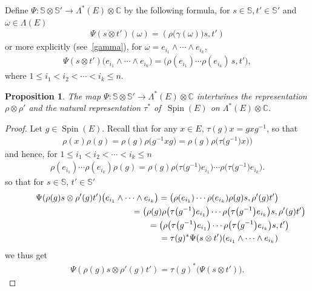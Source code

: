 \documentclass[pdftex]{sigma}
\DeclareMathOperator{\Spin}{Spin}
\numberwithin{equation}{section}
\newtheorem{prop}[theor]{Proposition}
\begin{document}
Define $\Psi \colon \mathbb S\otimes \mathbb S'\to\Lambda^*(E)\otimes \mathbb C$ by the following formula, for $s\in \mathbb S, t'\in \mathbb S'$ and $\omega\in \Lambda(E)$
\begin{gather*}
\Psi(s\otimes t') (\omega) = (\rho\big(\gamma(\omega)\big)s,t')
\end{gather*}
or more explicitly (see~\eqref{gamma}), for $\omega = e_{i_1}\wedge \cdots \wedge e_{i_k}$,
\begin{gather*}
\Psi(s\otimes t') \big(e_{i_1}\wedge \cdots \wedge e_{i_k} \big) = \big( \rho(e_{i_1}) \cdots \rho(e_{i_k})\, s,t'\big),
\end{gather*}
where $1\leq i_1<i_2<\cdots<i_k\leq n$.
\begin{prop} The map $\Psi \colon \mathbb S \otimes \mathbb S' \to \Lambda^*(E) \otimes \mathbb C$ intertwines the representation $\rho\otimes \rho'$ and the natural representation $\tau^*$ of \,$\Spin(E)$ on $\Lambda^*(E)\otimes \mathbb C$.
\end{prop}
%
\begin{proof}
Let $g\in \Spin(E)$. Recall that for any $x\in E$, $\tau(g) x = gxg^{-1}$, so that
\begin{gather*}
\rho(x) \rho(g) = \rho(g) \rho\big(g^{-1}xg\big) = \rho(g) \rho\big(\tau\big(g^{-1}\big) x)\big)
\end{gather*}
and hence, for $1\leq i_1<i_2<\cdots <i_k\leq n$
\begin{gather*}
\rho(e_{i_1}) \cdots \rho(e_{i_k}) \rho(g) = \rho(g) \rho\big( \tau\big(g^{-1}\big) e_{i_1}\big)\cdots \rho\big( \tau\big(g^{-1}\big) e_{i_k}\big).
\end{gather*}
so that for $s\in \mathbb S$, $t'\in \mathbb S'$
\begin{gather*}
\Psi(\rho(g)s\otimes\rho'(g)t')\big( e_{i_1}\wedge \cdots \wedge e_{i_k}\big) = \big(\rho(e_{i_1}) \cdots \rho(e_{i_k}) \rho(g) s,\rho'(g)t'\big)
\\ \hphantom{\Psi(\rho(g)s\otimes\rho'(g)t')\big( e_{i_1}\wedge \cdots \wedge e_{i_k}\big)}
 {}= \big( \rho(g) \rho\big( \tau\big(g^{-1}\big) e_{i_1}\big)\cdots \rho\big( \tau\big(g^{-1}\big) e_{i_k}\big)s, \rho'(g) t'\big)
 \\ \hphantom{\Psi(\rho(g)s\otimes\rho'(g)t')\big( e_{i_1}\wedge \cdots \wedge e_{i_k}\big)}
{} = \big( \rho\big( \tau\big(g^{-1}\big) e_{i_1}\big)\cdots \rho\big( \tau\big(g^{-1}\big) e_{i_k}\big)s, t'\big)
 \\ \hphantom{\Psi(\rho(g)s\otimes\rho'(g)t')\big( e_{i_1}\wedge \cdots \wedge e_{i_k}\big)}
{} = \tau(g)^*\Psi(s\otimes t') (e_{i_1}\wedge \dots \wedge e_{i_k})
\end{gather*}
we thus get
\begin{gather*}
\Psi(\rho(g)s\otimes \rho'(g)t') = \tau(g)^*\big( \Psi (s\otimes t')\big).
 \tag*{\qed}
\end{gather*}
\renewcommand{\qed}{}
\end{proof}
\end{document}
